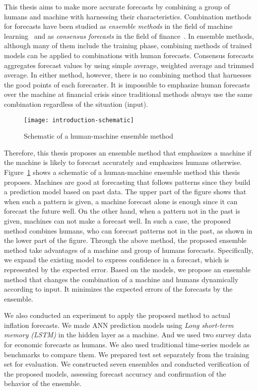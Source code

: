 \documentclass[../main.tex]{subfiles}
\begin{document}
This thesis aims to make more accurate forecasts by combining a group of humans and machine with harnessing their characteristics.
Combination methods for forecasts have been studied as \emph{ensemble methods} in the field of machine learning~\cite{Zhou2012} and as \emph{consensus forecasts} in the field of finance~\cite{Armstrong2001}.
In ensemble methods, although many of them include the training phase, combining methods of trained models can be applied to combinations with human forecasts.
Consensus forecasts aggregates forecast values by using simple average, weighted average and trimmed average.
In either method, however, there is no combining method that harnesses the good points of each forecaster.
It is impossible to emphasize human forecasts over the machine at financial crisis since traditional methods always use the same combination regardless of the situation (input).

\begin{figure}
  \centering
  \texttt{[image: introduction-schematic]}
  \caption{
    Schematic of a human-machine ensemble method
  }\label{fig: schematic}
\end{figure}

Therefore, this thesis proposes an ensemble method that emphasizes a machine if the machine is likely to forecast accurately and emphasizes humans otherwise.
Figure~\ref{fig: schematic} shows a schematic of a human-machine ensemble method this thesis proposes.
Machines are good at forecasting that follows patterns since they build a prediction model based on past data.
The upper part of the figure shows that when such a pattern is given, a machine forecast alone is enough since it can forecast the future well.
On the other hand, when a pattern not in the past is given, machines can not make a forecast well.
In such a case, the proposed method combines humans, who can forecast patterns not in the past, as shown in the lower part of the figure.
Through the above method, the proposed ensemble method take advantages of a machine and group of humans forecasts.
Specifically, we expand the existing model to express confidence in a forecast, which is represented by the expected error.
Based on the models, we propose an ensemble method that changes the combination of a machine and humans dynamically according to input.  It minimizes the expected errors of the forecasts by the ensemble.

We also conducted an experiment to apply the proposed method to actual inflation forecasts.
We made ANN prediction models using \emph{Long short-term memory (LSTM)} in the hidden layer as a machine.
And we used two survey data for economic forecasts as humans.
We also used traditional time-series models as benchmarks to compare them.
We prepared test set separately from the training set for evaluation.
We constructed seven ensembles and conducted verification of the proposed models, assessing forecast accuracy and confirmation of the behavior of the ensemble.
\end{document}
